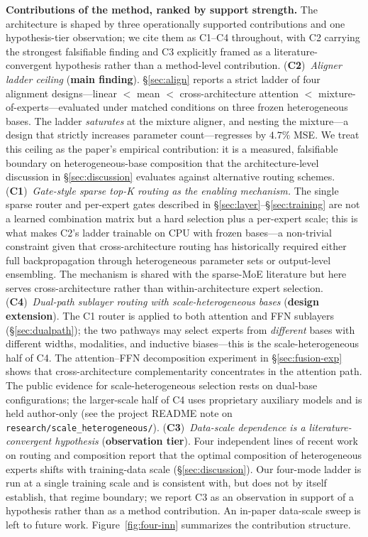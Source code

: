 \documentclass[10pt,twoside]{article}
\theoremstyle{definition}
\begin{document}
\textbf{Contributions of the method, ranked by support strength.} The architecture is shaped by three operationally supported contributions and one hypothesis-tier observation; we cite them as C1--C4 throughout, with C2 carrying the strongest falsifiable finding and C3 explicitly framed as a literature-convergent hypothesis rather than a method-level contribution. (\textbf{C2})~\emph{Aligner ladder ceiling} (\textbf{main finding}). \S\ref{sec:align} reports a strict ladder of four alignment designs---linear $<$ mean $<$ cross-architecture attention $<$ mixture-of-experts---evaluated under matched conditions on three frozen heterogeneous bases. The ladder \emph{saturates} at the mixture aligner, and nesting the mixture---a design that strictly increases parameter count---regresses by $4.7\%$ MSE. We treat this ceiling as the paper's empirical contribution: it is a measured, falsifiable boundary on heterogeneous-base composition that the architecture-level discussion in \S\ref{sec:discussion} evaluates against alternative routing schemes. (\textbf{C1})~\emph{Gate-style sparse top-K routing as the enabling mechanism.} The single sparse router and per-expert gates described in \S\ref{sec:layer}--\S\ref{sec:training} are not a learned combination matrix but a hard selection plus a per-expert scale; this is what makes C2's ladder trainable on CPU with frozen bases---a non-trivial constraint given that cross-architecture routing has historically required either full backpropagation through heterogeneous parameter sets or output-level ensembling. The mechanism is shared with the sparse-MoE literature \citep{shazeer2017,lecun1990optimal,jacobs1991} but here serves cross-architecture rather than within-architecture expert selection. (\textbf{C4})~\emph{Dual-path sublayer routing with scale-heterogeneous bases} (\textbf{design extension}). The C1 router is applied to both attention and FFN sublayers (\S\ref{sec:dualpath}); the two pathways may select experts from \emph{different} bases with different widths, modalities, and inductive biases---this is the scale-heterogeneous half of C4. The attention--FFN decomposition experiment in \S\ref{sec:fusion-exp} shows that cross-architecture complementarity concentrates in the attention path. The public evidence for scale-heterogeneous selection rests on dual-base configurations; the larger-scale half of C4 uses proprietary auxiliary models and is held author-only (see the project README note on \texttt{research/scale\_heterogeneous/}). (\textbf{C3})~\emph{Data-scale dependence is a literature-convergent hypothesis} (\textbf{observation tier}). Four independent lines of recent work on routing and composition report that the optimal composition of heterogeneous experts shifts with training-data scale (\S\ref{sec:discussion}). Our four-mode ladder is run at a single training scale and is consistent with, but does not by itself establish, that regime boundary; we report C3 as an observation in support of a hypothesis rather than as a method contribution. An in-paper data-scale sweep is left to future work. Figure~\ref{fig:four-inn} summarizes the contribution structure.
\end{document}
